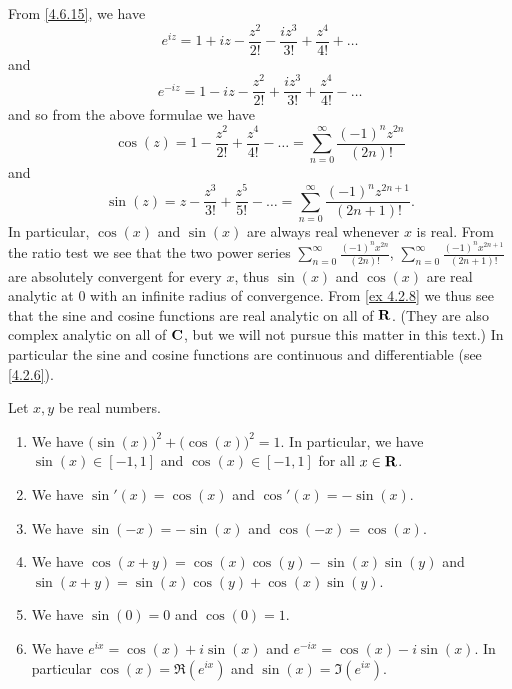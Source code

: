 \begin{additional corollary}\label{ac 4.7.1}
From \cref{4.6.15}, we have
\[
  e^{i z} = 1 + i z - \frac{z^2}{2!} - \frac{i z^3}{3!} + \frac{z^4}{4!} + \dots
\]
and
\[
  e^{- i z} = 1 - i z - \frac{z^2}{2!} + \frac{i z^3}{3!} + \frac{z^4}{4!} - \dots
\]
and so from the above formulae we have
\[
  \cos(z) = 1 - \frac{z^2}{2!} + \frac{z^4}{4!} - \dots = \sum_{n = 0}^\infty \frac{(-1)^n z^{2n}}{(2n)!}
\]
and
\[
  \sin(z) = z - \frac{z^3}{3!} + \frac{z^5}{5!} - \dots = \sum_{n = 0}^\infty \frac{(-1)^n z^{2n + 1}}{(2n + 1)!}.
\]
In particular, \(\cos(x)\) and \(\sin(x)\) are always real whenever \(x\) is real.
From the ratio test we see that the two power series \(\sum_{n = 0}^\infty \frac{(-1)^n x^{2n}}{(2n)!}\), \(\sum_{n = 0}^\infty \frac{(-1)^n x^{2n + 1}}{(2n + 1)!}\) are absolutely convergent for every \(x\), thus \(\sin(x)\) and \(\cos(x)\) are real analytic at \(0\) with an infinite radius of convergence.
From \cref{ex 4.2.8} we thus see that the sine and cosine functions are real analytic on all of \(\mathbf{R}\).
(They are also complex analytic on all of \(\mathbf{C}\), but we will not pursue this matter in this text.)
In particular the sine and cosine functions are continuous and differentiable (see \cref{4.2.6}).
\end{additional corollary}

\begin{theorem}\label{4.7.2}
  Let \(x, y\) be real numbers.
  \begin{enumerate}
    \item We have \(\big(\sin(x)\big)^2 + \big(\cos(x)\big)^2 = 1\).
          In particular, we have \(\sin(x) \in [-1, 1]\) and \(\cos(x) \in [-1, 1]\) for all \(x \in \mathbf{R}\).
    \item We have \(\sin'(x) = \cos(x)\) and \(\cos'(x) = -\sin(x)\).
    \item We have \(\sin(-x) = -\sin(x)\) and \(\cos(-x) = \cos(x)\).
    \item We have \(\cos(x + y) = \cos(x) \cos(y) - \sin(x) \sin(y)\) and \(\sin(x + y) = \sin(x) \cos(y) + \cos(x) \sin(y)\).
    \item We have \(\sin(0) = 0\) and \(\cos(0) = 1\).
    \item We have \(e^{i x} = \cos(x) + i \sin(x)\) and \(e^{- i x} = \cos(x) - i \sin(x)\).
          In particular \(\cos(x) = \Re(e^{i x})\) and \(\sin(x) = \Im(e^{i x})\).
  \end{enumerate}
\end{theorem}

